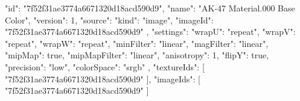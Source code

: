 {
  "id": "7f52f31ae3774a6671320d18acd590d9",
  "name": "AK-47 Material.000 Base Color",
  "version": 1,
  "source": {
    "kind": "image",
    "imageId": "7f52f31ae3774a6671320d18acd590d9"
  },
  "settings": {
    "wrapU": "repeat",
    "wrapV": "repeat",
    "wrapW": "repeat",
    "minFilter": "linear",
    "magFilter": "linear",
    "mipMap": true,
    "mipMapFilter": "linear",
    "anisotropy": 1,
    "flipY": true,
    "precision": "low",
    "colorSpace": "srgb"
  },
  "textureIds": [
    "7f52f31ae3774a6671320d18acd590d9"
  ],
  "imageIds": [
    "7f52f31ae3774a6671320d18acd590d9"
  ]
}
